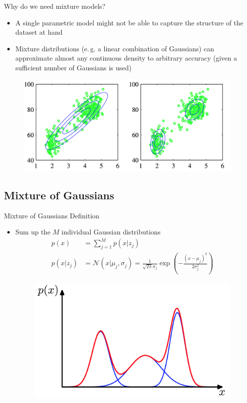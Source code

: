 \begin{frame}{Why do we need mixture models?}{}
	\begin{itemize}
		\item A single parametric model might not be able to capture the structure of the dataset at hand
		\item Mixture distributions (e.\,g. a linear combination of Gaussians) can approximate almost any continuous density to arbitrary accuracy (given a sufficient number of Gaussians is used)
	\end{itemize}
	\begin{figure}
		\centering
		\includegraphics[scale=0.30]{04_density_estimation/02_img/mixturemodels_oldfaithful.png}
	\end{figure}
\end{frame}

\subsection{Mixture of Gaussians}
\begin{frame}{Mixture of Gaussians Definition}{}
	\begin{itemize}
		\item Sum up the $M$ individual Gaussian distributions
		\begin{align}
			p(x) &= \sum_{j=1}^M p(x|z_j)\\
			p(x|z_j) &= \mathcal{N}(x|\mu_j, \sigma_j) = \frac{1}{\sqrt{2\pi}\sigma_j} \exp\left(-\frac{(x - \mu_j)^2}{2\sigma_j^2}\right)
		\end{align}
		\begin{figure}
			\centering
			\includegraphics[scale=0.20]{04_density_estimation/02_img/gaussianmixturedistribution}
		\end{figure}
	\end{itemize}
\end{frame}

